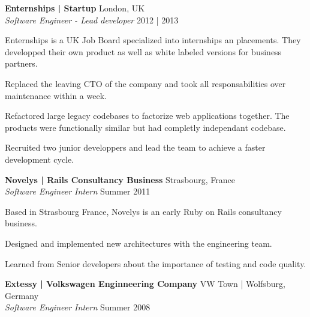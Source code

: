 \documentclass[a4paper]{article}
\begin{document}
\vspace{2mm}

\textbf{Enternships | Startup} \hfill London, UK\\
\textit{Software Engineer - Lead developer} \hfill 2012 | 2013\\
\vspace{2mm}

\begin{itshape}
Enternships is a UK Job Board specialized into internships an placements.
They developped their own product as well as white labeled versions for business partners.
\end{itshape}

Replaced the leaving CTO of the company and took all responsabilities over maintenance within a week.

Refactored large legacy codebases to factorize web applications together.
The products were functionally similar but had completly independant codebase.

Recruited two junior developpers and lead the team to achieve a faster development cycle.

\vspace{2mm}

\textbf{Novelys | Rails Consultancy Business} \hfill Strasbourg, France\\
\textit{Software Engineer Intern} \hfill Summer 2011\\
\vspace{2mm}

\begin{itshape}
Based in Strasbourg France, Novelys is an early Ruby on Rails consultancy business.
\end{itshape}

Designed and implemented new architectures with the engineering team.


Learned from Senior developers about the importance of testing and code quality.


\vspace{2mm}

\textbf{Extessy | Volkswagen Enginneering Company} \hfill VW Town | Wolfsburg, Germany\\
\textit{Software Engineer Intern} \hfill Summer 2008\\
\vspace{2mm}
\end{document}
